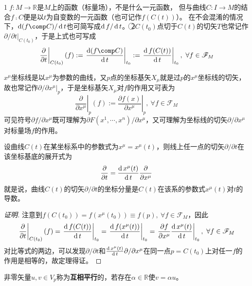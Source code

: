\begin{note}
\textcircled{1}$f \colon M \to \mathbb{R}$是$M$上的函数（标量场），不是什么一元函数，
但与曲线$C \colon I \to M$的结合$f \comp C$便是以$t$为自变数的一元函数（也可记作$f(C(t))$）。
在不会混淆的情况下，$\diff (f \comp C) / \diff t$也可简写成$\operatorname{d} f / \operatorname{d} t$。
\textcircled{2}$C(t_0)$点切于$C(t)$的切矢$T$也常记作$\partial / \partial t|_{C(t_0)}$，于是上式也可写成
$$\left.\frac{\partial}{\partial t}\right|_{C(t_0)}(f) := \left.\frac{\diff (f \comp C)}{\diff t}\right|_{t_0} := \left.\frac{\diff f(C(t))}{\diff t}\right|_{t_0}, ~ \forall f \in \mathscr{F}_M$$
\end{note}

\begin{example}
$x^\mu$坐标线是以$x^\mu$为参数的曲线，又$p$点的坐标基矢$X_\mu$就是过$p$的$x^\mu$坐标线的切矢，故也常记作$\partial / \partial x^\mu|_p$，于是坐标基矢$X_\mu$对$f$的作用又可表为
$$\left.\frac{\partial}{\partial x^\mu}\right|_p(f) := \left.\frac{\partial f(x)}{\partial x^\mu}\right|_p, ~ \forall f \in \mathscr{F}_M$$
可见符号$\partial f / \partial x^\mu$既可理解为$\partial F(x^1, \cdots, x^n) / \partial x^\mu$，又可理解为坐标线的切矢$\partial / \partial x^\mu$对标量场$f$的作用。
\end{example}

\begin{theorem}
设曲线$C(t)$在某坐标系中的参数式为$x^\mu = x^\mu(t)$，则线上任一点的切矢$\partial / \partial t$在该坐标基底的展开式为
$$\frac{\partial}{\partial t} = \frac{\operatorname{d} x^\mu(t)}{\operatorname{d} t}\frac{\partial}{\partial x^\mu}$$
就是说，曲线$C(t)$的切矢$\partial / \partial t$的坐标分量是$C(t)$在该系的参数式$x^\mu(t)$对$t$的导数。
\end{theorem}

\begin{proof}[证明]
注意到$f(C(t_0)) = f(x^\mu(t_0)) \equiv f(p), ~ \forall f \in \mathscr{F}_M$，因此
$$\left.\frac{\partial}{\partial t}\right|_{C(t_0)}(f) = \left.\frac{\operatorname{d} f(C(t))}{\operatorname{d} t}\right|_{t_0}
= \left.\frac{\operatorname{d} f(x^\mu(t))}{\operatorname{d} t}\right|_{t_0} = \left.\frac{\partial f}{\partial x^\mu}\frac{\operatorname{d} x^\mu(t)}{\operatorname{d} t}\right|_{t_0}, ~ \forall f \in \mathscr{F}_M$$
对比等式的两边，可以发现$\partial / \partial t$和$\frac{\operatorname{d} x^\mu(t)}{\operatorname{d} t}\partial / \partial x^\mu$在同一点$p = C(t_0)$上对任一$f$的作用是相等的，故定理得证。
\end{proof}

\begin{definition}
非零矢量$u, v \in V_p$称为\textbf{互相平行}的，若存在$\alpha \in \mathbb{R}$使$v = \alpha u$。
\end{definition}


